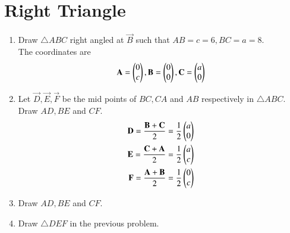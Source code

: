 \documentclass[journal,12pt,twocolumn]{IEEEtran}
\renewcommand\thesection{\arabic{section}}
\begin{document}
\section{Right Triangle}
\begin{enumerate}[label=\thesection.\arabic*
,ref=\thesection.\theenumi]
%
\item Draw $\triangle ABC$  right angled at $\vec{B}$ such that $AB = c =6, BC = a =8$.
\\
\solution The coordinates are
\begin{align}
\label{eq:rt_triang}
\mathbf{A}=\begin{pmatrix}0 \\ c\end{pmatrix}
,
\mathbf{B}=\begin{pmatrix}0 \\ 0\end{pmatrix}
,
\mathbf{C}=\begin{pmatrix}a \\ 0\end{pmatrix}
\end{align}
\item Let $\vec{D}, \vec{E}, \vec{F}$ be the mid points of $BC,CA$ and $AB$ respectively in $\triangle ABC$. Draw $AD,BE$ and $CF$.
\\
\solution 
\begin{align}
\label{eq:rt_triang_mid}
\mathbf{D} = \frac{\mathbf{B}+\mathbf{C}}{2} = \frac{1}{2}\begin{pmatrix}a \\ 0\end{pmatrix}
\\
\mathbf{E} = \frac{\mathbf{C}+\mathbf{A}}{2} = \frac{1}{2}\begin{pmatrix}a \\ c\end{pmatrix}
\\
\mathbf{F} = \frac{\mathbf{A}+\mathbf{B}}{2} = \frac{1}{2}\begin{pmatrix}0 \\ c\end{pmatrix}
\end{align}
\item  Draw $AD, BE$ and $CF$.
\item Draw $\triangle DEF$ in the previous problem.

\end{enumerate}
\end{document}
